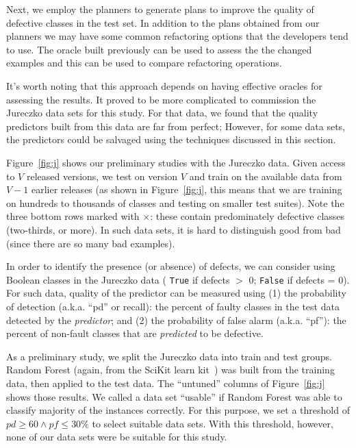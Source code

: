\documentclass{sig-alternate}
\newcommand{\fig}[1]{Figure~\ref{fig:#1}}
\begin{document}
Next, we employ the planners to generate plans to improve the quality of defective classes in the test set. In addition to the plans obtained from our planners we may have some common refactoring options that the developers tend to use. The oracle built previously can be used to assess the the changed examples and this can be used to compare refactoring operations.

It's worth noting that this approach depends on having effective oracles for assessing the results. It proved to be more complicated to commission the Jureczko data sets for this study. For that data, we found that the quality predictors built from this data are far from perfect; However, for some data sets, the  predictors could be salvaged using the techniques discussed in this section.

\fig{j} shows our preliminary studies with the Jureczko data. Given access to $V$ released versions, we test on version $V$ and train on the available data from $V-1$ earlier releases (as shown in \fig{j}, this means that we are training on hundreds to thousands of classes and testing on smaller test suites). Note the   \colorbox{lavenderpink}{three bottom} \colorbox{lavenderpink}{rows}   marked with $\times$: these contain predominately defective classes (two-thirds, or more).  In such data sets, it is hard to distinguish good from bad (since there are so many bad examples). 

In order to identify the presence (or absence) of defects, we can consider using Boolean classes in the  Jureczko data ( \texttt{True} if defects $\gt$ 0; \texttt{False} if defects = 0). For such data, quality of the predictor can be measured using (1) the  probability of detection (a.k.a. ``pd'' or recall):  the percent of faulty classes in the test data detected by the {\em predictor}; and (2) the  probability of false alarm (a.k.a. ``pf''): the percent of non-fault classes that are {\em predicted} to be defective.

As a preliminary study, we split the Jureczko  data into train and test groups. Random Forest (again, from the SciKit learn kit~\cite{Pedregosa2012}) was built from the training data, then applied to the test data. The ``untuned'' columns of \fig{j} shows those results. We called a data set ``usable'' if Random Forest was able to classify majority of the instances correctly. For this purpose, we set a threshold of $\mathit{pd}\ge 60 \wedge \mathit{pf} \le 30$\% to select suitable data sets. With this threshold, however, none of our data sets were be suitable for this study.
\end{document}
